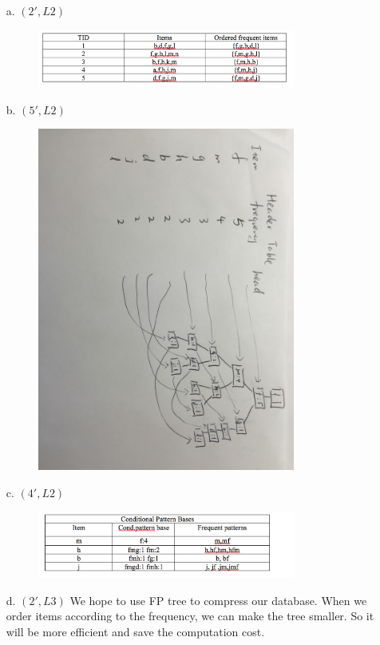 \begin{enumerate}
  \item[a.] $(2', L2)$ 
  \begin{figure}[H]
\includegraphics[width=0.8\textwidth]{Figures/order.png}
\centering
\end{figure}


  \item[b.] $(5', L2)$ 
  \begin{figure}[H]
\includegraphics[width=0.8\textwidth]{Figures/header.png}
\centering
\end{figure}

  \item[c.] $(4', L2)$ 
  
    \begin{figure}[H]
\includegraphics[width=0.8\textwidth]{Figures/cond.png}
\centering
\end{figure}
  
  \item[d.] $(2', L3)$ We hope to use FP tree to compress our database. When we order items according to the frequency, we can make the tree smaller. So it will be more efficient and save the computation cost.
  
\end{enumerate}


